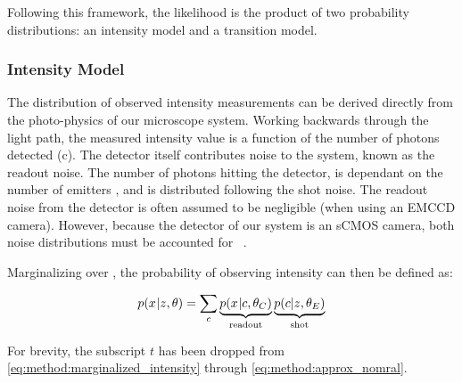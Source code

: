   Following this framework, the likelihood is the product of two probability distributions:
  an intensity model and a transition model.

\subsubsection{Intensity Model}
The distribution of observed intensity measurements can be derived directly from the photo-physics of our microscope system.
  Working backwards through the light path, the measured intensity value \x{} is a function of the number of photons \photons detected
  (c).
  The detector itself contributes noise to the system, known as the readout noise. 
  The number of photons hitting the detector, is dependant on the number of emitters \z, and is distributed following the shot noise.
  The readout noise from the detector is often assumed to be negligible (\ie when using an EMCCD camera).
  However, because the detector of our system is an sCMOS camera, both noise distributions must be accounted for
  ~\cite{huang_video-rate_2013}.

  Marginalizing over \photons, the probability of observing intensity \x{} can then be defined as:

  \begin{equation}
    p(x_{}|z_{},\theta) = \sum_c \underbrace{p(x_{}|c,\theta_C)}_{\text{readout}} 
    \underbrace{p(c|z_{},\theta_E)}_{\text{shot}}
    \label{eq:method:marginalized_intensity}
  \end{equation}

  For brevity, the subscript $t$ has been dropped from \eqref{eq:method:marginalized_intensity} through \eqref{eq:method:approx_nomral}.


